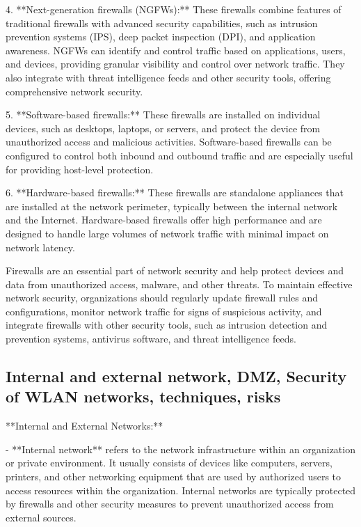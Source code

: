 \documentclass{article}
\begin{document}
4. **Next-generation firewalls (NGFWs):** These firewalls combine features of traditional firewalls with advanced security capabilities, such as intrusion prevention systems (IPS), deep packet inspection (DPI), and application awareness. NGFWs can identify and control traffic based on applications, users, and devices, providing granular visibility and control over network traffic. They also integrate with threat intelligence feeds and other security tools, offering comprehensive network security.

5. **Software-based firewalls:** These firewalls are installed on individual devices, such as desktops, laptops, or servers, and protect the device from unauthorized access and malicious activities. Software-based firewalls can be configured to control both inbound and outbound traffic and are especially useful for providing host-level protection.

6. **Hardware-based firewalls:** These firewalls are standalone appliances that are installed at the network perimeter, typically between the internal network and the Internet. Hardware-based firewalls offer high performance and are designed to handle large volumes of network traffic with minimal impact on network latency.

Firewalls are an essential part of network security and help protect devices and data from unauthorized access, malware, and other threats. To maintain effective network security, organizations should regularly update firewall rules and configurations, monitor network traffic for signs of suspicious activity, and integrate firewalls with other security tools, such as intrusion detection and prevention systems, antivirus software, and threat intelligence feeds.


\subsection{Internal and external network, DMZ, Security of WLAN networks, techniques, risks}

**Internal and External Networks:**

- **Internal network** refers to the network infrastructure within an organization or private environment. It usually consists of devices like computers, servers, printers, and other networking equipment that are used by authorized users to access resources within the organization. Internal networks are typically protected by firewalls and other security measures to prevent unauthorized access from external sources.
\end{document}
